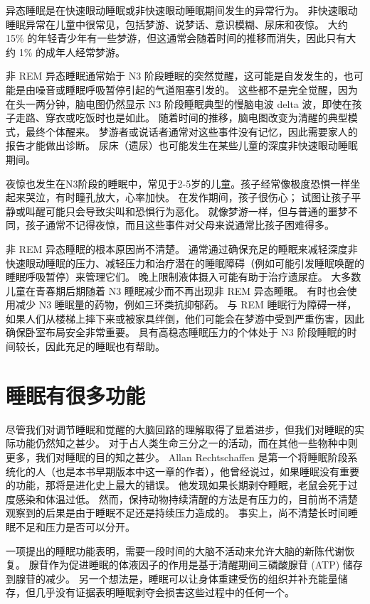 异态睡眠是在快速眼动睡眠或非快速眼动睡眠期间发生的异常行为。 非快速眼动睡眠异常在儿童中很常见，包括梦游、说梦话、意识模糊、尿床和夜惊。 大约 15\% 的年轻青少年有一些梦游，但这通常会随着时间的推移而消失，因此只有大约 1\% 的成年人经常梦游。

非 REM 异态睡眠通常始于 N3 阶段睡眠的突然觉醒，这可能是自发发生的，也可能是由噪音或睡眠呼吸暂停引起的气道阻塞引发的。 这些都不是完全觉醒，因为在头一两分钟，脑电图仍然显示 N3 阶段睡眠典型的慢脑电波 delta 波，即使在孩子走路、穿衣或吃饭时也是如此。 随着时间的推移，脑电图改变为清醒的典型模式，最终个体醒来。 梦游者或说话者通常对这些事件没有记忆，因此需要家人的报告才能做出诊断。 尿床（遗尿）也可能发生在某些儿童的深度非快速眼动睡眠期间。

夜惊也发生在N3阶段的睡眠中，常见于2-5岁的儿童。孩子经常像极度恐惧一样坐起来哭泣，有时瞳孔放大，心率加快。 在发作期间，孩子很伤心； 试图让孩子平静或叫醒可能只会导致尖叫和恐惧行为恶化。 就像梦游一样，但与普通的噩梦不同，孩子通常不记得夜惊，而且这些事件对父母来说通常比孩子困难得多。

非 REM 异态睡眠的根本原因尚不清楚。 通常通过确保充足的睡眠来减轻深度非快速眼动睡眠的压力、减轻压力和治疗潜在的睡眠障碍（例如可能引发睡眠唤醒的睡眠呼吸暂停）来管理它们。 晚上限制液体摄入可能有助于治疗遗尿症。 大多数儿童在青春期后期随着 N3 睡眠减少而不再出现非 REM 异态睡眠。 有时也会使用减少 N3 睡眠量的药物，例如三环类抗抑郁药。 与 REM 睡眠行为障碍一样，如果人们从楼梯上摔下来或被家具绊倒，他们可能会在梦游中受到严重伤害，因此确保卧室布局安全非常重要。 具有高稳态睡眠压力的个体处于 N3 阶段睡眠的时间较长，因此充足的睡眠也有帮助。

\section{睡眠有很多功能}

尽管我们对调节睡眠和觉醒的大脑回路的理解取得了显着进步，但我们对睡眠的实际功能仍然知之甚少。 对于占人类生命三分之一的活动，而在其他一些物种中则更多，我们对睡眠的目的知之甚少。 Allan Rechtschaffen 是第一个将睡眠阶段系统化的人（也是本书早期版本中这一章的作者），他曾经说过，如果睡眠没有重要的功能，那将是进化史上最大的错误。 他发现如果长期剥夺睡眠，老鼠会死于过度感染和体温过低。 然而，保持动物持续清醒的方法是有压力的，目前尚不清楚观察到的后果是由于睡眠不足还是持续压力造成的。 事实上，尚不清楚长时间睡眠不足和压力是否可以分开。

一项提出的睡眠功能表明，需要一段时间的大脑不活动来允许大脑的新陈代谢恢复。 腺苷作为促进睡眠的体液因子的作用是基于清醒期间三磷酸腺苷 (ATP) 储存到腺苷的减少。 另一个想法是，睡眠可以让身体重建受伤的组织并补充能量储存，但几乎没有证据表明睡眠剥夺会损害这些过程中的任何一个。

